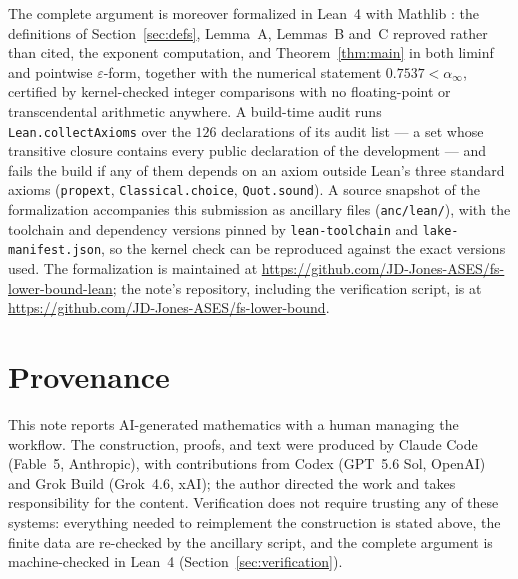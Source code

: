 \documentclass[11pt]{amsart}
\theoremstyle{plain}
\theoremstyle{remark}
\begin{document}
The complete argument is moreover formalized in Lean~4 \cite{Lean4} with
Mathlib \cite{Mathlib}: the definitions of Section~\ref{sec:defs}, Lemma~A,
Lemmas~B and~C reproved rather than cited, the exponent computation, and
Theorem~\ref{thm:main} in both liminf and pointwise $\varepsilon$-form,
together with the numerical statement $0.7537 < \alpha_\infty$, certified by
kernel-checked integer comparisons with no floating-point or transcendental
arithmetic anywhere. A build-time audit runs \texttt{Lean.collectAxioms}
over the $126$ declarations of its audit list --- a set whose transitive
closure contains every public declaration of the development --- and fails
the build if any of them depends on an axiom outside Lean's three standard
axioms (\texttt{propext}, \texttt{Classical.choice}, \texttt{Quot.sound}). A source snapshot of the
formalization accompanies this submission as ancillary files
(\texttt{anc/lean/}), with the toolchain and dependency versions pinned by
\texttt{lean-toolchain} and \texttt{lake-manifest.json}, so the kernel check
can be reproduced against the exact versions used. The formalization is
maintained at \url{https://github.com/JD-Jones-ASES/fs-lower-bound-lean};
the note's repository, including the verification script, is at
\url{https://github.com/JD-Jones-ASES/fs-lower-bound}.

\section*{Provenance}

This note reports AI-generated mathematics with a human managing the
workflow. The construction, proofs, and text were produced by Claude Code
(Fable~5, Anthropic), with contributions from Codex (GPT~5.6 Sol, OpenAI)
and Grok Build (Grok~4.6, xAI); the author directed the work and takes
responsibility for the content. Verification does not require trusting any
of these systems: everything needed to reimplement the construction is
stated above, the finite data are re-checked by the ancillary script, and
the complete argument is machine-checked in Lean~4
(Section~\ref{sec:verification}).
\end{document}
